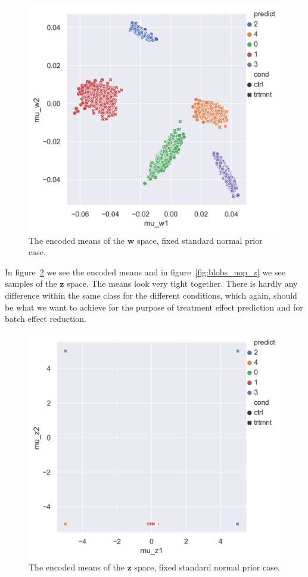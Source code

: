 \documentclass[11pt, a4paper]{report}
\theoremstyle{plain}
\theoremstyle{definition}
\theoremstyle{remark}
\newcommand{\z}{\mathbf{z}}
\newcommand{\w}{\mathbf{w}}
\begin{document}
\begin{figure}[h]
\centering
\includegraphics[width=1.1\textwidth]{images/blobs_cgmvae_stdprior_mu_w.png}
\caption{The encoded means of the $\w$ space, fixed standard normal prior case.
}
\label{fig:blobs_nop_muw}
\end{figure}

In figure~\ref{fig:blobs_nop_muz} we see the encoded means and in
figure~\ref{fig:blobs_nop_z} we see samples of the $\z$ space. The means look
very tight together. There is hardly any difference within  the same class for
the different conditions, which again, should be what we want to achieve for the
purpose of treatment effect prediction and for batch effect reduction.


\begin{figure}[h]
\centering
\includegraphics[width=1.1\textwidth]{images/blobs_cgmvae_stdprior_mu_z.png}
\caption{The encoded means of the $\z$ space, fixed standard normal prior case.
}
\label{fig:blobs_nop_muz}
\end{figure}
\end{document}
